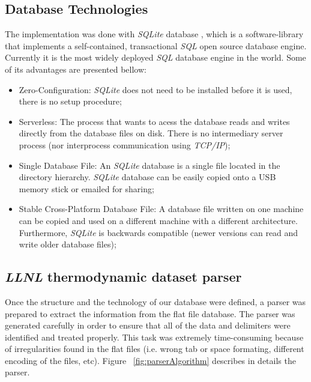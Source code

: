 \subsection{Database Technologies}
The implementation was done with \emph{SQLite} database \cite{SQLite}, which is a software-library that implements a self-contained, transactional \emph{SQL} open source database engine. Currently it is the most widely deployed \emph{SQL} database engine in the world. Some of its advantages are presented bellow:
\begin{itemize}
\item Zero-Configuration: \emph{SQLite} does not need to be installed before it is used, there is no setup procedure;
\item Serverless: The process that wants to acess the database reads and writes directly from the database files on disk. There is no intermediary server process (nor interprocess communication using \emph{TCP/IP});
\item Single Database File: An \emph{SQLite} database is a single file located in the directory hierarchy. \emph{SQLite} database can be easily copied onto a USB memory stick or emailed for sharing;
\item Stable Cross-Platform Database File: A database file written on one machine can be copied and used on a different machine with a different architecture. Furthermore, \emph{SQLite} is backwards compatible (newer versions can read and write older database files);
\end{itemize}

\subsection{\emph{LLNL} thermodynamic dataset parser}
Once the structure and the technology of our database were defined, a parser was prepared to extract the information from the flat file database. 
The parser was generated carefully in order to ensure that all of the data and delimiters were identified and treated properly. This task was extremely time-consuming because of irregularities found in the flat files (i.e. wrong tab or space formating, different encoding of the files, etc). Figure ~\ref{fig:parserAlgorithm} describes in details the parser.

